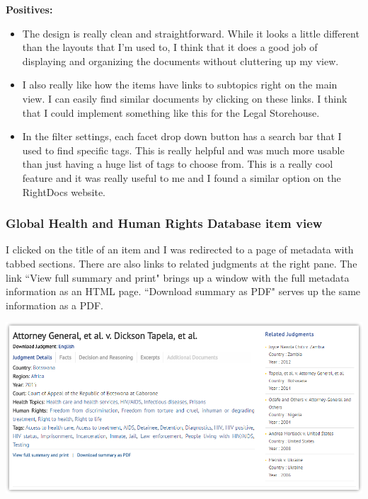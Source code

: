 \documentclass{article}
\begin{document}
\noindent\textbf{Positives:}
\begin{itemize}
\itemsep0em 
    \item The design is really clean and straightforward. While it looks a little different than the layouts that I'm used to, I think that it does a good job of displaying and organizing the documents without cluttering up my view.
    \item I also really like how the items have links to subtopics right on the main view. I can easily find similar documents by clicking on these links. I think that I could implement something like this for the Legal Storehouse.
    \item In the filter settings, each facet drop down button has a search bar that I used to find specific tags. This is really helpful and was much more usable than just having a huge list of tags to choose from. This is a really cool feature and it was really useful to me and I found a similar option on the RightDocs website.
\end{itemize}

\subsubsection{Global Health and Human Rights Database item view}
\noindent I clicked on the title of an item and I was redirected to a page of metadata with tabbed sections. There are also links to related judgments at the right pane. The link ``View full summary and print" brings up a window with the full metadata information as an HTML page. ``Download summary as PDF" serves up the same information as a PDF.

\noindent\includegraphics[width=\textwidth]{2016-06-09-Global-Health-Item}
\end{document}
